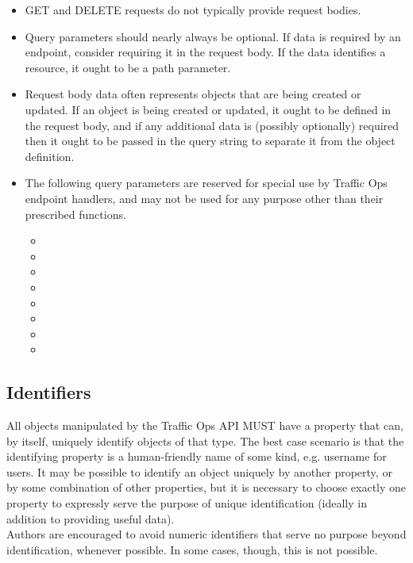 \begin{itemize}
	\item GET and DELETE requests do not typically provide request bodies.
	\item Query parameters should nearly always be optional. If data is required by an endpoint, consider requiring it in the request body. If the data identifies a resource, it ought to be a path parameter.
	\item Request body data often represents objects that are being created or updated. If an object is being created or updated, it ought to be defined in the
	request body, and if any additional data is (possibly optionally) required then it ought to be passed in the query string to separate it from the object definition.
	\item The following query parameters are reserved for special use by Traffic Ops endpoint handlers, and may not be used for any purpose other
	than their prescribed functions.
	\begin{itemize}
		\item {}
		\item {}
		\item {}
		\item {}
		\item {}
		\item {}
		\item {}
		\item {}
	\end{itemize}
\end{itemize}

\subsection{Identifiers}
All objects manipulated by the Traffic Ops API MUST have a property that can, by itself, uniquely identify objects of that type. The best case
scenario is that the identifying property is a human-friendly name of some kind, e.g. username for users. It may be possible to identify an
object uniquely by another property, or by some combination of other properties, but it is necessary to choose exactly one property to expressly
serve the purpose of unique identification (ideally in addition to providing useful data).\\
Authors are encouraged to avoid numeric identifiers that serve no purpose beyond identification, whenever possible. In some cases, though, this
is not possible.

